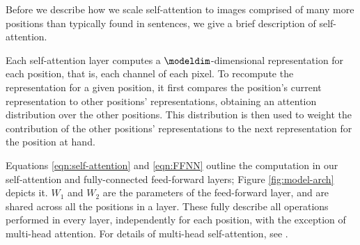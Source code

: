 Before we describe how we scale self-attention to images comprised of many more positions than typically found in sentences, we give a brief description of self-attention.


Each self-attention layer computes a $\modeldim$-dimensional representation for each position, that is, each channel of each pixel. To recompute the representation for a given position, it first compares the position's current representation to other positions' representations, obtaining an attention distribution over the other positions. This distribution is then used to weight the contribution of the other positions' representations to the next representation for the position at hand.


Equations \ref{eqn:self-attention} and \ref{eqn:FFNN} outline the computation in our self-attention and fully-connected feed-forward layers; Figure \ref{fig:model-arch} depicts it. $W_1$ and $W_2$ are the parameters of the feed-forward layer, and are shared across all the positions in a layer.  These fully describe all operations performed in every layer, independently for each position, with the exception of multi-head attention. For details of multi-head self-attention, see \citep{aiayn}.



